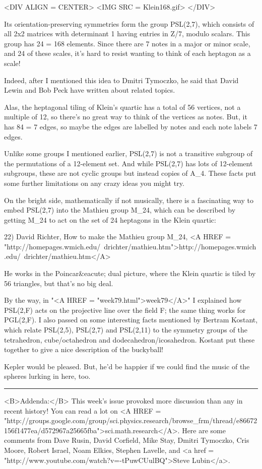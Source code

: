 <DIV ALIGN = CENTER>
<IMG SRC = Klein168.gif>
</DIV>

Its orientation-preserving symmetries
form the group PSL(2,7), which consists of all 2x2 matrices with
determinant 1 having entries in Z/7, modulo scalars.  This group has
24  = 168 elements.  Since there are 7 notes in a major or
minor scale, and 24 of these scales, it's hard to resist wanting to
think of each heptagon as a scale!

Indeed, after I mentioned this idea to Dmitri Tymoczko, he said
that David Lewin and Bob Peck have written about related topics.  

Alas, the heptagonal tiling of Klein's quartic has a total of 56 
vertices, not a multiple of 12, so there's no great way to think 
of the vertices as notes.  But, it has 84 = 7  edges, so 
maybe the edges are labelled by notes and each note labels 7 edges.

Unlike some groups I mentioned earlier, PSL(2,7) is not a transitive
subgroup of the permutations of a 12-element set.  And while PSL(2,7) has 
lots of 12-element subgroups, these are not cyclic groups but 
instead copies of A_{4}.  These facts put some further limitations 
on any crazy ideas you might try.

On the bright side, mathematically if not musically, there is a 
fascinating way to embed PSL(2,7) into the Mathieu group M_{24},
which can be described by getting M_{24} to act on the
set of 24 heptagons in the Klein quartic:

22) David Richter, How to make the Mathieu group M_{24},
<A HREF = "http://homepages.wmich.edu/~drichter/mathieu.htm">http://homepages.wmich.edu/~drichter/mathieu.htm</A>

He works in the Poincar&eacute; dual picture, where the Klein quartic
is tiled by 56 triangles, but that's no big deal.

By the way, in "<A HREF = "week79.html">week79</A>" I explained how
PSL(2,F) acts on the projective line over the field F; the same thing
works for PGL(2,F).  I also passed on some interesting facts mentioned
by Bertram Kostant, which relate PSL(2,5), PSL(2,7) and PSL(2,11) to
the symmetry groups of the tetrahedron, cube/octahedron and
dodecahedron/icosahedron.  Kostant put these together to give a nice
description of the buckyball!

Kepler would be pleased.  But, he'd be happier if we could find
the music of the spheres lurking in here, too.
\par\noindent\rule{\textwidth}{0.4pt}
<B>Addenda:</B>  This week's issue provoked more discussion than any in 
recent history!  You can read a lot on
<A HREF = "http://groups.google.com/group/sci.physics.research/browse_frm/thread/e86672156f1477ea/d572967a25665fba">sci.math.research</A>.
Here are some comments from Dave Rusin, David Corfield, Mike
Stay, Dmitri Tymoczko, Cris Moore, Robert Israel, Noam Elkies, Stephen 
Lavelle, and <a href = "http://www.youtube.com/watch?v=-tPuwCUulBQ">Steve 
Lubin</a>.


